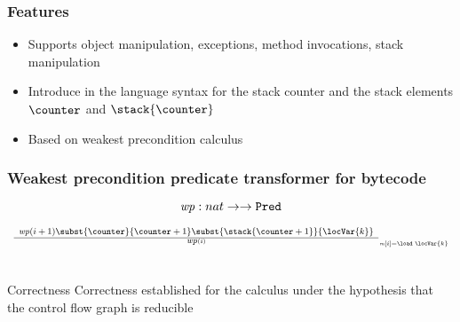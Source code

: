 \documentclass{beamer}
\begin{document}
\begin{frame}\frametitle{Features} 
  \begin{itemize}

   
   \item Supports object manipulation, exceptions, method invocations, stack manipulation
    \item  Introduce in the language syntax for the stack counter and the 
         stack elements $\counter$ and $\stack{\counter}$ 
   \item Based on weakest precondition calculus
\end{itemize}

\end{frame}
\begin{frame}\frametitle{Weakest precondition predicate transformer for bytecode}
\begin{definition}
   $$\mbox{\rm\textit{wp}}:  nat \rightarrow  \rightarrow \mbox{\rm\texttt{Pred}} $$
\end{definition}

\begin{example}
   $$ {\small \begin{array}{l}
        
      \frac{ \begin{array}{l}
	       \wpi(i+1)\subst{\counter}{\counter+1} \subst{\stack{\counter + 1}}{\locVar{k}} \\
              
             \end{array}
           }{\wpi(i)}_{\tiny \methodd[i] = \load \  \locVar{k} }
         
	 
	\\\\\\

        
      \end{array} } $$
\end{example}

\begin{block}{Correctness}
Correctness established for the calculus  under the hypothesis that the control flow graph is reducible
\end{block}

\end{frame}
\end{document}
